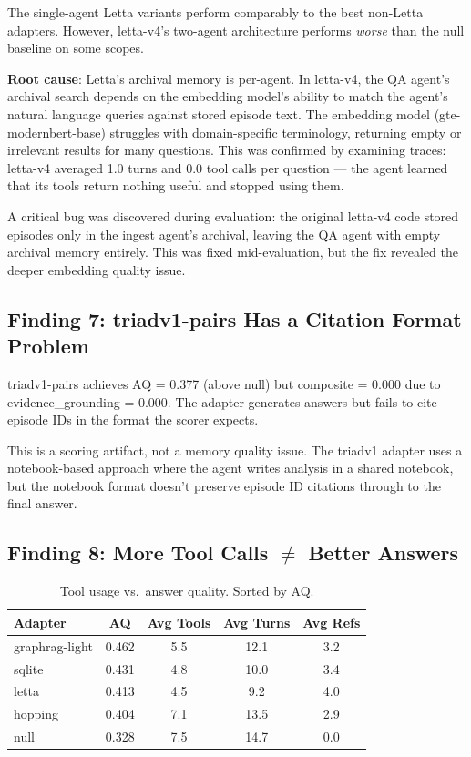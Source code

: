 \documentclass[11pt,a4paper]{article}
\begin{document}
The single-agent Letta variants perform comparably to the best non-Letta adapters.
However, letta-v4's two-agent architecture performs \emph{worse} than the null baseline on some scopes.

\textbf{Root cause}: Letta's archival memory is per-agent.
In letta-v4, the QA agent's archival search depends on the embedding model's ability to match the agent's natural language queries against stored episode text.
The embedding model (gte-modernbert-base) struggles with domain-specific terminology, returning empty or irrelevant results for many questions.
This was confirmed by examining traces: letta-v4 averaged 1.0 turns and 0.0 tool calls per question --- the agent learned that its tools return nothing useful and stopped using them.

A critical bug was discovered during evaluation: the original letta-v4 code stored episodes only in the ingest agent's archival, leaving the QA agent with empty archival memory entirely.
This was fixed mid-evaluation, but the fix revealed the deeper embedding quality issue.

\subsection{Finding 7: triadv1-pairs Has a Citation Format Problem}

triadv1-pairs achieves AQ = 0.377 (above null) but composite = 0.000 due to evidence\_grounding = 0.000.
The adapter generates answers but fails to cite episode IDs in the format the scorer expects.

This is a scoring artifact, not a memory quality issue.
The triadv1 adapter uses a notebook-based approach where the agent writes analysis in a shared notebook, but the notebook format doesn't preserve episode ID citations through to the final answer.

\subsection{Finding 8: More Tool Calls $\neq$ Better Answers}

\begin{table}[H]
\centering
\caption{Tool usage vs.\ answer quality. Sorted by AQ.}
\begin{tabular}{lcccc}
\toprule
\textbf{Adapter} & \textbf{AQ} & \textbf{Avg Tools} & \textbf{Avg Turns} & \textbf{Avg Refs} \\
\midrule
graphrag-light & 0.462 & 5.5 & 12.1 & 3.2 \\
sqlite & 0.431 & 4.8 & 10.0 & 3.4 \\
letta & 0.413 & 4.5 & 9.2 & 4.0 \\
hopping & 0.404 & 7.1 & 13.5 & 2.9 \\
null & 0.328 & 7.5 & 14.7 & 0.0 \\
\bottomrule
\end{tabular}
\end{table}
\end{document}
